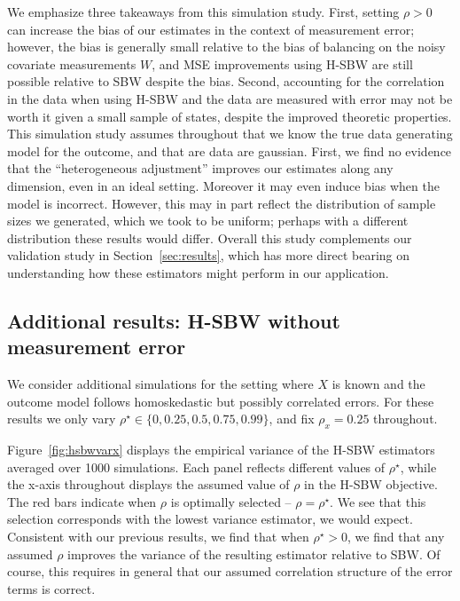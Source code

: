 We emphasize three takeaways from this simulation study. First, setting $\rho > 0$ can increase the bias of our estimates in the context of measurement error; however, the bias is generally small relative to the bias of balancing on the noisy covariate measurements $W$, and MSE improvements using H-SBW are still possible relative to SBW despite the bias. Second, accounting for the correlation in the data when using H-SBW and the data are measured with error may not be worth it given a small sample of states, despite the improved theoretic properties. This simulation study assumes throughout that we know the true data generating model for the outcome, and that are data are gaussian. First, we find no evidence that the ``heterogeneous adjustment'' improves our estimates along any dimension, even in an ideal setting. Moreover it may even induce bias when the model is incorrect. However, this may in part reflect the distribution of sample sizes we generated, which we took to be uniform; perhaps with a different distribution these results would differ. Overall this study complements our validation study in Section~\ref{sec:results}, which has more direct bearing on understanding how these estimators might perform in our application.

\subsection{Additional results: H-SBW without measurement error}\label{appssec:simstudyresults2}

We consider additional simulations for the setting where $X$ is known and the outcome model follows homoskedastic but possibly correlated errors. For these results we only vary $\rho^\star \in \{0, 0.25, 0.5, 0.75, 0.99\}$, and fix $\rho_x = 0.25$ throughout. 

Figure~\ref{fig:hsbwvarx} displays the empirical variance of the H-SBW estimators averaged over 1000 simulations. Each panel reflects different values of $\rho^\star$, while the x-axis throughout displays the assumed value of $\rho$ in the H-SBW objective. The red bars indicate when $\rho$ is optimally selected -- $\rho = \rho^\star$. We see that this selection corresponds with the lowest variance estimator, we would expect. Consistent with our previous results, we find that when $\rho^\star > 0$, we find that any assumed $\rho$ improves the variance of the resulting estimator relative to SBW. Of course, this requires in general that our assumed correlation structure of the error terms is correct.

